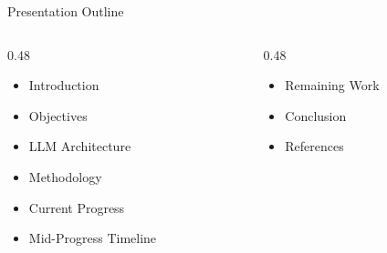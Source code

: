 \begin{frame}{Presentation Outline}
    \begin{columns}[T, onlytextwidth]
        \begin{column}{0.48\textwidth}
            \begin{itemize}
                \item Introduction
                \item Objectives
                \item LLM Architecture
                \item Methodology
                \item Current Progress
                \item Mid-Progress Timeline
            \end{itemize}
        \end{column}
        \begin{column}{0.48\textwidth}
            \begin{itemize}
                \item Remaining Work
                \item Conclusion
                \item References
            \end{itemize}
        \end{column}
    \end{columns}
\end{frame}
